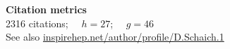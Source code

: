 \renewenvironment{spacelist} {
  \begin{list} {} {
    \setlength{\topsep}{-8 pt}
    \setlength{\itemsep}{5 pt}
    \setlength{\leftmargin}{-1.15 in}
  }
}{
  \end{list}
}

\raggedright

\begin{spacelist}
  \item {\large \bfseries Citation metrics} \\[6 pt]
  2316 citations; \ \ \href{https://en.wikipedia.org/wiki/H-index}{$h = 27$}; \ \ \href{https://en.wikipedia.org/wiki/G-index}{$g = 46$} \\[2 pt]
  See also \href{http://inspirehep.net/author/profile/D.Schaich.1}{inspirehep.net/author/profile/D.Schaich.1} \\[15 pt]


\end{spacelist}
